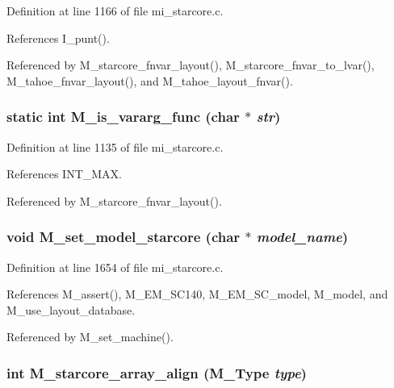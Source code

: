 Definition at line 1166 of file mi\_\-starcore.c.

References I\_\-punt().

Referenced by M\_\-starcore\_\-fnvar\_\-layout(), M\_\-starcore\_\-fnvar\_\-to\_\-lvar(), M\_\-tahoe\_\-fnvar\_\-layout(), and M\_\-tahoe\_\-layout\_\-fnvar().
\subsubsection{\setlength{\rightskip}{0pt plus 5cm}static int M\_\-is\_\-vararg\_\-func (char $\ast$ {\em str})\hspace{0.3cm}{\tt  [static]}}\label{mi__starcore_8c_80785a5a94a20615e3feaa3457765efc}




Definition at line 1135 of file mi\_\-starcore.c.

References INT\_\-MAX.

Referenced by M\_\-starcore\_\-fnvar\_\-layout().
\subsubsection{\setlength{\rightskip}{0pt plus 5cm}void M\_\-set\_\-model\_\-starcore (char $\ast$ {\em model\_\-name})}\label{mi__starcore_8c_0691646cf002ab7356290bf0ac43f641}




Definition at line 1654 of file mi\_\-starcore.c.

References M\_\-assert(), M\_\-EM\_\-SC140, M\_\-EM\_\-SC\_\-model, M\_\-model, and M\_\-use\_\-layout\_\-database.

Referenced by M\_\-set\_\-machine().
\subsubsection{\setlength{\rightskip}{0pt plus 5cm}int M\_\-starcore\_\-array\_\-align (\bf{M\_\-Type} {\em type})}\label{mi__starcore_8c_7c2c3a053971ccabebfc2a2d93b87a83}




